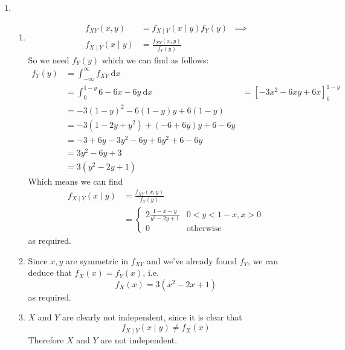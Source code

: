 \documentclass{article}
\theoremstyle{definition}
\theoremstyle{remark}
\theoremstyle{example}
\renewcommand{\d}{\ \mathrm{d}}
\begin{document}
\begin{enumerate}
		\item \begin{enumerate}
			\item 
			\begin{align*}
				f_{XY}(x,y)&=f_{X \mid Y}(x \mid y)f_Y(y) & \implies\\
				f_{X \mid Y}(x \mid y)&=\frac{f_{XY}(x,y)}{f_Y(y)}
			\end{align*}
			So we need $f_Y(y)$ which we can find as follows:
			\begin{align*}
				f_Y(y)&=\int_{-\infty}^{\infty}f_{XY} \d x\\
				&=\int_{0}^{1-y}6-6x-6y \d x\
				&=\left[-3x^2-6xy+6x\right]^{1-y}_0\\
				&=-3(1-y)^2-6(1-y)y+6(1-y)\\
				&=-3(1-2y+y^2)+(-6+6y)y+6-6y\\
				&=-3+6y-3y^2-6y+6y^2+6-6y\\
				&=3y^2-6y+3\\
				&=3(y^2-2y+1)
			\end{align*}
			Which means we can find 
			\begin{align*}
				f_{X \mid Y}(x \mid y)&=\frac{f_{XY}(x,y)}{f_Y(y)}\\
				&=\begin{cases}
					2\frac{1-x-y}{y^2-2y+1} & 0 < y < 1-x, x > 0\\
					0 & \mathrm{otherwise}
				\end{cases}
			\end{align*}
			as required.
			\item Since $x,y$ are symmetric in $f_{XY}$ and we've already found $f_Y$, we can deduce that $f_X(x)=f_Y(x)$, i.e. \[f_X(x)=3(x^2-2x+1)\] as required.
			\item $X$ and $Y$ are clearly not independent, since it is clear that \[
			f_{X \mid Y}(x \mid y) \neq f_X(x)\]
			Therefore $X$ and $Y$ are not independent.
		\end{enumerate}

	\end{enumerate}
\end{document}
